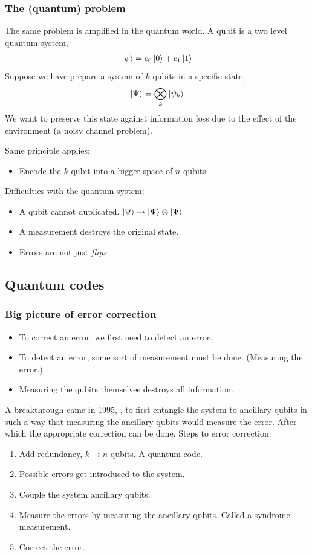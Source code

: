 \documentclass{beamer}
\renewcommand{\(}{\left(}
\renewcommand{\)}{\right)}
\renewcommand{\[}{\left[}
\renewcommand{\]}{\right]}
\begin{document}
\begin{frame}
    \frametitle{The (quantum) problem}
    The same problem is amplified in the quantum world.
    A qubit is a two level quantum system, 
    \begin{align*}
        \ket{\psi} = c_0 \ket{0} + c_1 \ket{1}
    \end{align*}
    Suppose we have prepare a system of $k$ qubits in a specific state,
    \begin{align*}
        \ket{\Psi} = \bigotimes_{k}\ket{\psi_k}
    \end{align*} 
    \pause
    We want to preserve this state against information loss due to the effect of the environment (a noisy channel problem). 

    Same principle applies:
    \begin{itemize}
        \item Encode the $k$ qubit into a bigger space of $n$ qubits. 
    \end{itemize}
    \pause
    Difficulties with the quantum system: 
    \begin{itemize}
        \item A qubit cannot duplicated. $\ket{\Psi} \rightarrow \ket{\Psi} \otimes \ket{\Psi}$
        \item A measurement destroys the original state. 
        \item Errors are not just \emph{flips}.
    \end{itemize}
\end{frame}

\subsection{Quantum codes}
\begin{frame}
    \frametitle{Big picture of error correction}
    \begin{itemize}
        \item To correct an error, we first need to detect an error. 
        \item To detect an error, some sort of measurement must be done. (Measuring the error.) 
        \item Measuring the qubits themselves destroys all information. 
    \end{itemize}
    \pause
    A breakthrough came in 1995, \citep{Shor_1995}, to first entangle the system to ancillary qubits in such a way that measuring the ancillary qubits would measure the error. After which the appropriate correction can be done. 
    \pause
    Steps to error correction: 
    \begin{enumerate}
        \item Add redundancy, $k \rightarrow n$ qubits. A quantum code.
        \item Possible errors get introduced to the system. 
        \item Couple the system ancillary qubits.
        \item Measure the errors by measuring the ancillary qubits. Called a syndrome measurement. 
        \item Correct the error. 
    \end{enumerate}
\end{frame}
\end{document}
